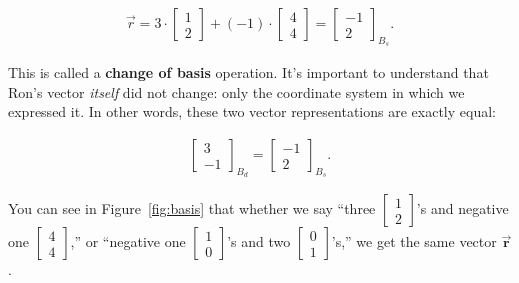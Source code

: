 \vspace{-.15in}
\begin{align*}
\overrightarrow{r} =
3 \cdot \begin{bmatrix} 1 \\ 2 \end{bmatrix} +
(-1) \cdot \begin{bmatrix} 4 \\ 4 \end{bmatrix} =
\begin{bmatrix} -1 \\ 2 \end{bmatrix}_{B_s}.
\end{align*}
\vspace{-.15in}


This is called a \textbf{change of basis} operation. It's important to
understand that Ron's vector \textit{itself} did not change: only the
coordinate system in which we expressed it. In other words, these two vector
representations are exactly equal:

\vspace{-.15in}
\begin{align*}
\begin{bmatrix} 3 \\ -1 \end{bmatrix}_{B_d} =
\begin{bmatrix} -1 \\ 2 \end{bmatrix}_{B_s}.
\end{align*}
\vspace{-.15in}

You can see in Figure~\ref{fig:basis} that whether we say ``three
{\scriptsize $\begin{bmatrix} 1 \\ 2 \end{bmatrix}$}'s and
negative one {\scriptsize $\begin{bmatrix} 4 \\ 4 \end{bmatrix}$},'' or
``negative one
{\scriptsize $\begin{bmatrix} 1 \\ 0 \end{bmatrix}$}'s and
two {\scriptsize $\begin{bmatrix} 0 \\ 1 \end{bmatrix}$}'s,'' we get the same
vector $\overrightarrow{\textbf{r}}$.

